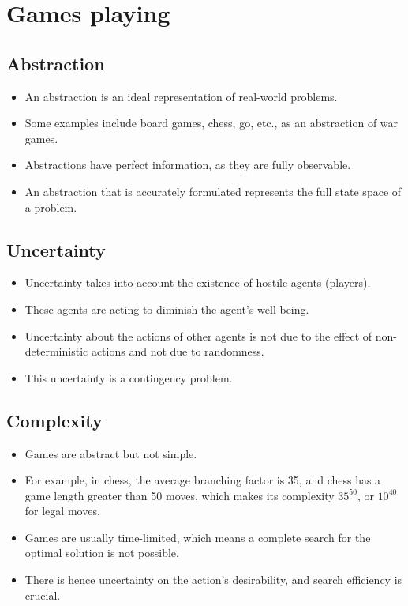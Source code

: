 \documentclass[11pt]{article}
\begin{document}
 \newpage
\section{Games playing}
\label{sec:org7ae6e0c}

\subsection{Abstraction}
\label{sec:org0faeb94}
\begin{itemize}
\item An abstraction is an ideal representation of real-world problems.
\item Some examples include board games, chess, go, etc., as an abstraction of war games.
\item Abstractions have perfect information, as they are fully observable.
\item An abstraction that is accurately formulated represents the full state space of a problem.
\end{itemize}
\subsection{Uncertainty}
\label{sec:orgfdd9acc}
\begin{itemize}
\item Uncertainty takes into account the existence of hostile agents (players).
\item These agents are acting to diminish the agent's well-being.
\item Uncertainty about the actions of other agents is not due to the effect of non-deterministic actions and not due to randomness.
\item This uncertainty is a contingency problem.
\end{itemize}
\subsection{Complexity}
\label{sec:orge3ef109}
\begin{itemize}
\item Games are abstract but not simple.
\item For example, in chess, the average branching factor is 35, and chess has a game length greater than 50 moves, which makes its complexity \(35^{50}\), or \(10^{40}\) for legal moves.
\item Games are usually time-limited, which means a complete search for the optimal solution is not possible.
\item There is hence uncertainty on the action's desirability, and search efficiency is crucial.
\end{itemize}
\end{document}
